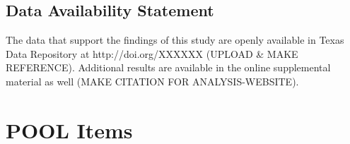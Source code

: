 \documentclass[man, noextraspace, floatsintext, 12pt]{apa7}
\begin{document}
\subsection{Data Availability Statement}
The data that support the findings of this study are openly available in Texas Data Repository at http://doi.org/XXXXXX (UPLOAD \& MAKE REFERENCE).
Additional results are available in the online supplemental material as well (MAKE CITATION FOR ANALYSIS-WEBSITE).

\newpage
\raggedright
% 
%
\printbibliography
\appendix

\section{POOL Items}
\end{document}
